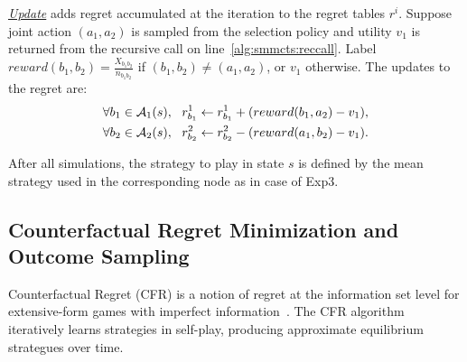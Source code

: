 \emph{\underline{Update}} adds regret accumulated at the iteration to
the regret tables $r^i$. Suppose joint action $(a_1,a_2)$ is
sampled from the selection policy and utility $v_1$ is returned from the recursive call on line~\ref{alg:smmcts:reccall}.
Label $reward(b_1,b_2) = \frac{X_{b_1b_2}}{n_{b_1b_2}}$ if
$(b_1,b_2) \not= (a_1,a_2)$, or $v_1$ otherwise. The updates to the regret are:
\begin{eqnarray}
\forall b_1 \in \mathcal{A}_1(s), ~~  r^1_{b_1} \leftarrow r^1_{b_1} + ( reward(b_1, a_2) - v_1 ),\\
\forall b_2 \in \mathcal{A}_2(s), ~~  r^2_{b_2} \leftarrow r^2_{b_2} - ( reward(a_1, b_2) - v_1).
\end{eqnarray}

After all simulations, the strategy to play in state $s$ is defined by the mean strategy used in the corresponding node as in case of Exp3.

\subsection{Counterfactual Regret Minimization and Outcome Sampling} \label{sec:algs:cfros}

Counterfactual Regret (CFR) is a notion of regret at the information set level for extensive-form games with imperfect information~\cite{CFR}.
The CFR algorithm iteratively learns strategies in self-play, producing approximate equilibrium strategues over time. 


